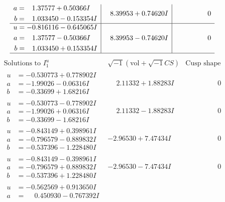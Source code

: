 \documentclass[1p]{elsarticle_modified}
\theoremstyle{definition}
\newcommand{\I}{\sqrt{-1}}
\begin{document}
$$\begin{array}{c|c|c}
\begin{aligned}
a &= \phantom{-}1.37577 + 0.50366 I \\
b &= \phantom{-}1.033450 - 0.153354 I\end{aligned}
 & \phantom{-}8.39953 + 0.74620 I & \phantom{-0.000000 } 0 \\ \hline\begin{aligned}
u &= -0.816116 - 0.645065 I \\
a &= \phantom{-}1.37577 - 0.50366 I \\
b &= \phantom{-}1.033450 + 0.153354 I\end{aligned}
 & \phantom{-}8.39953 - 0.74620 I & \phantom{-0.000000 } 0\\
 \hline 
 \end{array}$$\newpage$$\begin{array}{c|c|c}  
\text{Solutions to }I^u_{1}& \I (\text{vol} + \sqrt{-1}CS) & \text{Cusp shape}\\
 \hline 
\begin{aligned}
u &= -0.530773 + 0.778902 I \\
a &= -1.99026 - 0.06316 I \\
b &= -0.33699 + 1.68216 I\end{aligned}
 & \phantom{-}2.11332 + 1.88283 I & \phantom{-0.000000 } 0 \\ \hline\begin{aligned}
u &= -0.530773 - 0.778902 I \\
a &= -1.99026 + 0.06316 I \\
b &= -0.33699 - 1.68216 I\end{aligned}
 & \phantom{-}2.11332 - 1.88283 I & \phantom{-0.000000 } 0 \\ \hline\begin{aligned}
u &= -0.843149 + 0.398961 I \\
a &= -0.796579 - 0.889832 I \\
b &= -0.537396 - 1.228480 I\end{aligned}
 & -2.96530 + 7.47434 I & \phantom{-0.000000 } 0 \\ \hline\begin{aligned}
u &= -0.843149 - 0.398961 I \\
a &= -0.796579 + 0.889832 I \\
b &= -0.537396 + 1.228480 I\end{aligned}
 & -2.96530 - 7.47434 I & \phantom{-0.000000 } 0 \\ \hline\begin{aligned}
u &= -0.562569 + 0.913650 I \\
a &= \phantom{-}0.450930 - 0.767392 I \\

\end{aligned}
\end{array}$$
\end{document}
